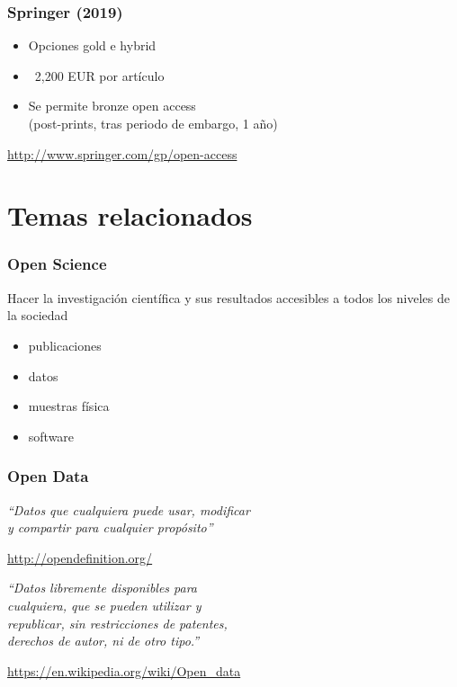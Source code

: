 \documentclass[17pt,aspectratio=169]{beamer}
\begin{document}
\begin{frame}
\frametitle{Springer (2019)}

\begin{itemize}
\item Opciones gold e hybrid
\item ~2,200 EUR por artículo
\item Se permite bronze open access \\
  (post-prints, tras periodo de embargo, 1 año) \\
\end{itemize}

\begin{flushright}
{\footnotesize \url{http://www.springer.com/gp/open-access}}
\end{flushright}

\end{frame}


\section{Temas relacionados}

\begin{frame}
\frametitle{Open Science}

Hacer la investigación científica y sus resultados accesibles a todos los niveles de la sociedad

\begin{itemize}
\item publicaciones
\item datos
\item muestras física
\item software
\end{itemize}

\end{frame}

\begin{frame}
\frametitle{Open Data}

{\em ``Datos que cualquiera puede usar, modificar \\
  y compartir para cualquier propósito'' \\
}
\begin{flushright}
  \url{http://opendefinition.org/}
\end{flushright}

{\em ``Datos libremente disponibles para \\
cualquiera, que se pueden utilizar y \\
republicar, sin restricciones de patentes, \\
derechos de autor, ni de otro tipo.'' \\
}

\begin{flushright}
  \url{https://en.wikipedia.org/wiki/Open_data}
\end{flushright}

\end{frame}
\end{document}
